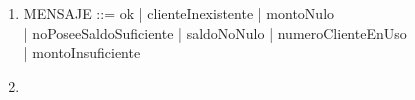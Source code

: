 \documentclass{article}
\begin{document}
\begin{enumerate}
    \begin{schema}{MontoRequeridoError}
      \Xi Banco \\
      m? : DINERO \\
      rep! : MENSAJE
      \where
      m? < 200 \\
      rep! = montoInsuficiente
    \end{schema}

    \begin{zed}
      MontoRequerido == MontoRequeridoOk \cup MontoRequeridoError
    \end{zed}

    \begin{zed}
      NuevoCliente = (NuevoClienteOk \lor ClienteExiste) \land MontoRequerido 
    \end{zed}
    \item 
      \begin{zed}
        MENSAJE ::= ok | clienteInexistente | montoNulo \\
                  | noPoseeSaldoSuficiente | saldoNoNulo | numeroClienteEnUso \\
                  | montoInsuficiente
      \end{zed}
    \item
      
\end{enumerate}
\end{document}
